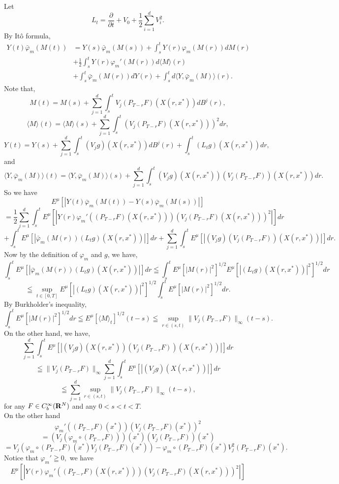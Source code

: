\documentclass[12pt]{article}
\begin{document}
Let 
$$L_t = \frac{\partial}{\partial t} + V_0+\frac{1}{2}\sum_{i=1}^d V_i^2.$$
By It\^o formula, 
\begin{align*}
Y(t)\bar{\varphi}_m(M(t))&=Y(s)\bar{\varphi}_m(M(s))+\int_s^t Y(r)\varphi_m(M(r))dM(r)\\
&+\frac{1}{2}\int_s^t Y(r)\varphi_m'(M(r))d\langle M \rangle(r)\\
&+\int_s^t \bar{\varphi}_m(M(r))dY(r)+\int_s^t d\langle Y, \bar{\varphi}_m(M) \rangle(r).
\end{align*}
Note that,
$$M(t)=M(s) + \sum_{j=1}^d \int_s^t V_j (P_{T-r}F)(X(r,x^*))dB^j(r),$$
$$\langle M \rangle(t)=\langle M \rangle(s) + \sum_{j=1}^d \int_s^t(V_j (P_{T-r}F)(X(r,x^*)))^2dr,$$
$$Y(t)=Y(s) + \sum_{j=1}^d \int_s^t  (V_jg)(X(r,x^*)) dB^j(r) +\int_s^t (L_t g)(X(r,x^*))dr,$$
and
$$\langle Y, \bar{\varphi}_m(M) \rangle(t)=\langle Y, \bar{\varphi}_m(M) \rangle(s) + \sum_{j=1}^d \int_s^t (V_jg)(X(r,x^*))(V_j (P_{T-r}F))(X(r,x^*))dr.$$
So we have
$$E^{\mu}[|Y(t)\bar{\varphi}_m(M(t)) - Y(s)\bar{\varphi}_m(M(s))|]$$
$$=\frac{1}{2}\sum_{j=1}^d \int_s^t E^{\mu}[|Y(r)\varphi_m'( (P_{T-r}F)(X(r,x^*)) ) \left(V_j (P_{T-r}F)(X(r,x^*))\right)^2|] dr$$
$$+\int_s^t E^{\mu}[|\bar{\varphi}_m(M(r)) (L_t g)(X(r,x^*))|]dr+ \sum_{j=1}^d \int_s^t E^{\mu}[|(V_jg)(V_j (P_{T-r}F))(X(r,x^*))|]dr.$$
Now by the definition of $\varphi_m$ and $g$,  we have,
$$\int_s^t E^{\mu}[|\bar{\varphi}_m(M(r)) (L_t g)(X(r,x^*))|]dr \leqq \int_s^t  E^{\mu}[|M(r)|^2]^{1/2}E^{\mu}[|(L_t g)(X(r,x^*))|^2]^{1/2}dr$$
$$ \leqq \sup_{t\in[0,T]}E^{\mu}[|(L_t g)(X(r,x^*))|^2]^{1/2} \int_s^t  E^{\mu}[|M(r)|^2]^{1/2}dr.$$
By Burkholder's inequality,
$$\int_s^t  E^{\mu}[|M(r)|^2]^{1/2}dr \leqq E^{\mu}[\langle M \rangle_t]^{1/2} (t-s)
 \leqq \sup_{r\in (s,t)} \|V_j (P_{T-r}F)\|_{\infty}(t-s).$$
 On the other hand, we have,
$$\sum_{j=1}^d \int_s^t E^{\mu}[|(V_jg)(X(r,x^*))(V_j (P_{T-r}F))(X(r,x^*))|]dr$$
$$ \leqq \|V_j (P_{T-r}F)\|_{\infty} \sum_{j=1}^d \int_s^t E^{\mu}[|(V_jg)(X(r,x^*))|]dr$$
$$\leqq \sum_{j=1}^d \sup_{r\in (s,t)} \|V_j (P_{T-r}F)\|_{\infty} (t-s),$$
for any $ F \in C_b^{\infty}({\bf R}^{N})$ and any $0< s < t< T$.\\ 
On the other hand
$$ \varphi_m' \left( (P_{T-r}F)(x^*) \right) \left(V_j (P_{T-r}F)(x^*)\right)^2$$
$$=\left(V_j (\varphi_m \circ (P_{T-r}F))\right) (x^*) \left(V_j (P_{T-r}F)\right)(x^*) $$
$$= V_j \left( \varphi_m \circ ( P_{T-r}F)(x^*)  V_j (P_{T-r}F)(x^*) \right) 
-  \varphi_m \circ (P_{T-r}F)(x^*)  V_j^2(P_{T-r}F) (x^*) . $$
Notice that  $\varphi_m' \geqq 0,$ we have
$$ E^{\mu}[|Y(r)\varphi_m' \left( (P_{T-r}F)(X(r,x^*)) \right) \left(V_j (P_{T-r}F)(X(r,x^*))\right)^2|]$$
\end{document}
